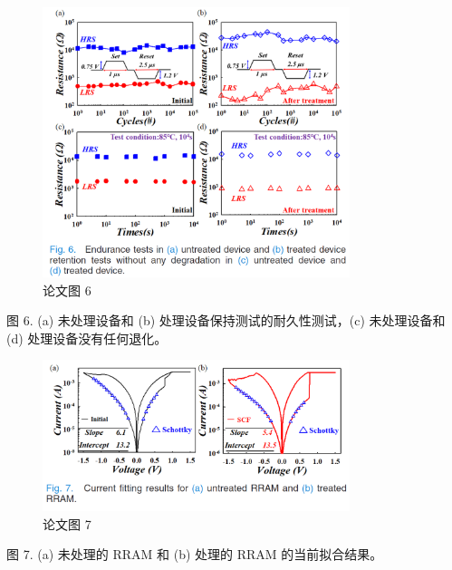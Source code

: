 \begin{figure}[htb]
\centering 
\includegraphics[width=0.80\textwidth]{img/c1m6.png} 
\caption{论文图 6}
\label{Test}
\end{figure}
图 6. (a) 未处理设备和 (b) 处理设备保持测试的耐久性测试，(c) 未处理设备和 (d) 处理设备没有任何退化。

\begin{figure}[htb]
\centering 
\includegraphics[width=0.80\textwidth]{img/c1m7.png} 
\caption{论文图 7}
\label{Test}
\end{figure}
图 7. (a) 未处理的 RRAM 和 (b) 处理的 RRAM 的当前拟合结果。

